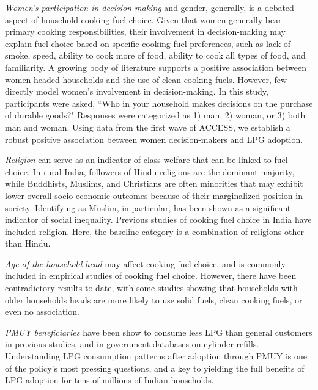 \documentclass[11pt,english]{article}
\theoremstyle{plain} \newtheorem{claim}{Claim}
\theoremstyle{plain} \newtheorem{prop}{Proposition}
\theoremstyle{plain} \newtheorem{hypo}{Hypothesis}
\begin{document}
\textit{Women's participation in decision-making} and gender, generally, is a debated aspect of household cooking fuel choice. Given that women generally bear primary cooking responsibilities, their involvement in decision-making may explain fuel choice based on specific cooking fuel preferences, such as lack of smoke, speed, ability to cook more of food, ability to cook all types of food, and familiarity. A growing body of literature supports a positive association between women-headed households and the use of clean cooking fuels\cite{Kumar2017,Beheraetal2015,Rahutetal2014,Heltberg2004}. However, few directly model women's involvement in decision-making\citep{Menghwanietal2019}. In this study, participants were asked, ``Who in your household makes decisions on the purchase of durable goods?" Responses were categorized as 1) man, 2) woman, or 3) both man and woman. Using data from the first wave of ACCESS, we establish a robust positive association between women decision-makers and LPG adoption\citep{GouldUrpelainen2019}. 

\textit{Religion} can serve as an indicator of class welfare that can be linked to fuel choice. In rural India, followers of Hindu religions are the dominant majority, while Buddhists, Muslims, and Christians are often minorities that may exhibit lower overall socio-economic outcomes because of their marginalized position in society\citep{BorooahIyer2005}. Identifying as Muslim, in particular, has been shown as a significant indicator of social inequality\citep{SaxenaBhattacharya2018}. Previous studies of cooking fuel choice in India have included religion\citep{Menghwanietal2019,Bhojvaidetal2014,LewisPattanayak2012}. Here, the baseline category is a combination of religions other than Hindu.

\textit{Age of the household head} may affect cooking fuel choice, and is commonly included in empirical studies of cooking fuel choice. However, there have been contradictory results to date\citep{MullerYan2018,LewisPattanayak2012}, with some studies showing that households with older households heads are more likely to use solid fuels\citep{BaiyegunhiHassan2014}, clean cooking fuels\citep{Wolfetal2017,Farsietal2007,GuptaKohlin2006}, or even no association\citep{Menghwanietal2019,Abebaw2008}. 

\textit{PMUY beneficiaries} have been show to consume less LPG than general customers in previous studies\citep{Karetal2019b,Tripathietal2020}, and in government databases on cylinder refills\citep{CAG2019}. Understanding LPG consumption patterns after adoption through PMUY is one of the policy's most pressing questions, and a key to yielding the full benefits of LPG adoption for tens of millions of Indian households.
\end{document}
